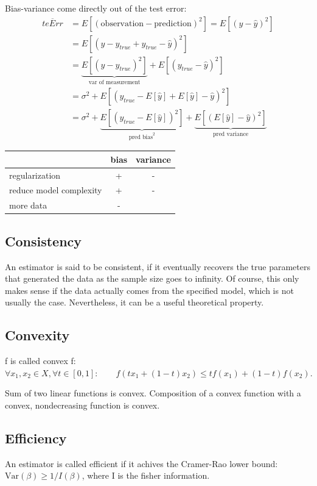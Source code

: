 \documentclass[10pt,a4paper,landscape]{article}
\newcommand{\Var}{\mathrm{Var}}
\begin{document}
\begin{multicols*}{4}
Bias-variance come directly out of the test error:
 \begin{align*}
 \overline{teErr}
 &= E[(\text{observation} - \text{prediction})^2] = E[(y - \hat{y})^2] \\
 &= E[(y - y_{true} + y_{true} - \hat{y})^2] \\
 &=\underbrace{E[(y - y_{true})^2]}_{\text{var of measurement}} + E[(y_{true} - \hat{y})^2] \\
 &=\sigma^2 + E[(y_{true} - E[\hat{y}] + E[\hat{y}] - \hat{y})^2] \\
 &=\sigma^2 + \underbrace{E[(y_{true} - E[\hat{y}])^2]}_{\text{pred bias}^2} +\underbrace{E[(E[\hat{y}] - \hat{y})^2]}_{\text{pred variance}}
\end{align*}

\begin{tabular}{ l || c | c }
                          & bias & variance \\
  \hline
  regularization          & +    & - \\
  reduce model complexity & +    & - \\
  more data               & -    & \\
  \hline
\end{tabular}

\subsection{Consistency}
An estimator is said to be consistent, if it eventually recovers the true parameters that generated the data as the sample size goes to infinity. Of course, this only makes sense if the data actually comes from the specified model, which is not usually the case. Nevertheless, it can be a useful theoretical property.

\subsection{Convexity}
f is called convex f: $\forall x_1, x_2 \in X, \forall t \in [0, 1]: \qquad f(tx_1+(1-t)x_2)\leq t f(x_1)+(1-t)f(x_2).$

Sum of two linear functions is convex. Composition of a convex function with a convex, nondecreasing function is convex.

\subsection{Efficiency}
An estimator is called efficient if it achives the Cramer-Rao lower bound:
$\Var{(\beta)} \geq 1/I(\beta)$, where I is the fisher information.


\end{multicols*}
\end{document}
